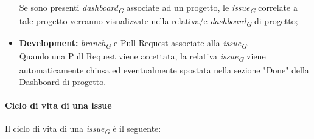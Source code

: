 \begin{itemize}
		Se sono presenti \textit{dashboard}\textsubscript{\textit{G}} associate ad un progetto, le \textit{issue}\textsubscript{\textit{G}} correlate a tale progetto verranno visualizzate nella relativa/e \textit{dashboard}\textsubscript{\textit{G}} di progetto;
		\item \textbf{Development:} \textit{branch}\textsubscript{\textit{G}} e Pull Request associate alla \textit{issue}\textsubscript{\textit{G}}. \\
		Quando una Pull Request viene accettata, la relativa \textit{issue}\textsubscript{\textit{G}} viene automaticamente chiusa ed eventualmente spostata nella sezione "Done" della Dashboard di progetto.
\end{itemize}

\paragraph*{Ciclo di vita di una issue}
Il ciclo di vita di una \textit{issue}\textsubscript{\textit{G}} è il seguente:
